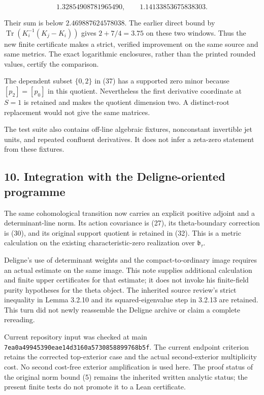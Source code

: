 \[
 1.32854908781965490,\qquad1.14133853675838303.                    \tag{65}
\]

Their sum is below \(2.469887624578038\). The earlier direct bound by \(\operatorname{Tr}(K_i^{-1}(K_j-K_i))\) gives \(2+7/4=3.75\) on these two windows. Thus the new finite certificate makes a strict, verified improvement on the same source and same metrics. The exact logarithmic enclosures, rather than the printed rounded values, certify the comparison.

The dependent subset \(\{0,2\}\) in (37) has a supported zero minor because \([p_2]=[p_0]\) in this quotient. Nevertheless the first derivative coordinate at \(S=1\) is retained and makes the quotient dimension two. A distinct-root replacement would not give the same matrices.

The test suite also contains off-line algebraic fixtures, nonconstant invertible jet units, and repeated confluent derivatives. It does not infer a zeta-zero statement from these fixtures.

\subsection{10. Integration with the Deligne-oriented programme}\label{endpoint-restriction_original--integration-with-the-deligne-oriented-programme}

The same cohomological transition now carries an explicit positive adjoint and a determinant-line norm. Its action covariance is (27), its theta-boundary correction is (30), and its original support quotient is retained in (32). This is a metric calculation on the existing characteristic-zero realization over \(\mathfrak b_\tau\).

Deligne's use of determinant weights and the compact-to-ordinary image requires an actual estimate on the same image. This note supplies additional calculation and finite upper certificates for that estimate; it does not invoke his finite-field purity hypotheses for the theta object. The inherited source review's strict inequality in Lemma 3.2.10 and its squared-eigenvalue step in 3.2.13 are retained. This turn did not newly reassemble the Deligne archive or claim a complete rereading.

Current repository input was checked at main \nolinkurl{7ea0a49945390eae14d3160a5730858899768b5f}. The current endpoint criterion retains the corrected top-exterior case and the actual second-exterior multiplicity cost. No second cost-free exterior amplification is used here. The proof status of the original norm bound (5) remains the inherited written analytic status; the present finite tests do not promote it to a Lean certificate.

